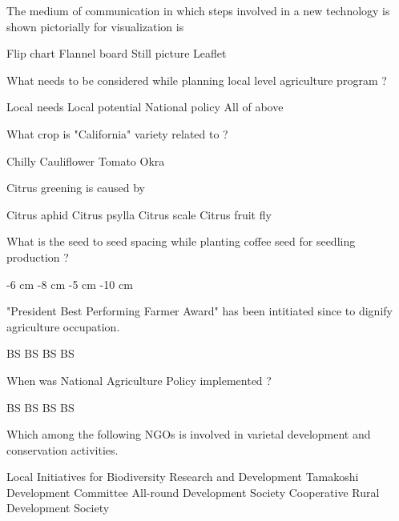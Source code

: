 \begin{questions}
\question The medium of communication in which steps involved in a new technology is shown pictorially for visualization is
\begin{choices}
\CorrectChoice Flip chart
\choice Flannel board
\choice Still picture
\choice Leaflet
\end{choices}

\question What needs to be considered while planning local level agriculture program ?
\begin{choices}
\choice Local needs
\choice Local potential
\choice National policy
\CorrectChoice All of above
\end{choices}

\question What crop is "California" variety related to ?
\begin{choices}
\CorrectChoice Chilly
\choice Cauliflower
\choice Tomato
\choice Okra
\end{choices}

\question Citrus greening is caused by
\begin{choices}
\choice Citrus aphid
\CorrectChoice Citrus psylla
\choice Citrus scale
\choice Citrus fruit fly
\end{choices}

\question What is the seed to seed spacing while planting coffee seed for seedling production ?
\begin{choices}
-6 cm
-8 cm
-5 cm
-10 cm
\end{choices}

\question "President Best Performing Farmer Award" has been intitiated since \fillin[][3cm] to dignify agriculture occupation.
\begin{choices}
 BS
 BS
 BS
 BS
\end{choices}

\question When was National Agriculture Policy implemented ?
\begin{choices}
 BS
 BS
 BS
 BS
\end{choices}

\question Which among the following NGOs is involved in varietal development and conservation activities.
\begin{choices}
\CorrectChoice Local Initiatives for Biodiversity Research and Development
\choice Tamakoshi Development Committee
\choice All-round Development Society
\choice Cooperative Rural Development Society
\end{choices}


\end{questions}
